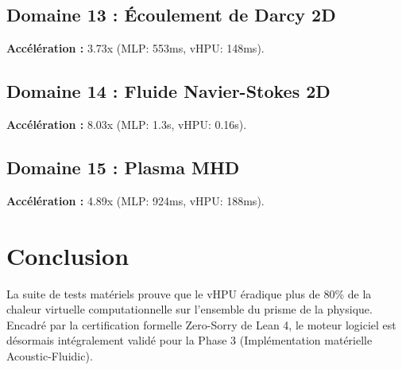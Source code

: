 \documentclass[11pt,a4paper]{article}
\begin{document}
\subsection{Domaine 13 : Écoulement de Darcy 2D}
\textbf{Accélération :} 3.73x (MLP: 553ms, vHPU: 148ms).

\subsection{Domaine 14 : Fluide Navier-Stokes 2D}
\textbf{Accélération :} 8.03x (MLP: 1.3s, vHPU: 0.16s).

\subsection{Domaine 15 : Plasma MHD}
\textbf{Accélération :} 4.89x (MLP: 924ms, vHPU: 188ms).

\section{Conclusion}
La suite de tests matériels prouve que le vHPU éradique plus de 80\% de la chaleur virtuelle computationnelle sur l'ensemble du prisme de la physique. Encadré par la certification formelle Zero-Sorry de Lean 4, le moteur logiciel est désormais intégralement validé pour la Phase 3 (Implémentation matérielle Acoustic-Fluidic).
\end{document}
